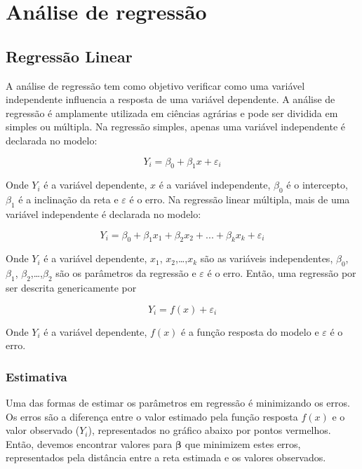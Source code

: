\documentclass[
]{book}
\begin{document}

\hypertarget{reg}{%
\chapter{Análise de regressão}\label{reg}}

\hypertarget{regressuxe3o-linear}{%
\section{Regressão Linear}\label{regressuxe3o-linear}}

A análise de regressão  tem como objetivo verificar como uma variável independente influencia a resposta de uma variável dependente. A análise de regressão é amplamente utilizada em ciências agrárias e pode ser dividida em simples ou múltipla. Na regressão simples, apenas uma variável independente é declarada no modelo:

\[
Y_i = {\beta _0} + {\beta _1}x + \varepsilon_i  
\]

Onde \(Y_i\) é a variável dependente, \(x\) é a variável independente, \(\beta_0\) é o intercepto, \(\beta_1\) é a inclinação da reta e \(\varepsilon\) é o erro. Na regressão linear múltipla, mais de uma variável independente é declarada no modelo:

\[
Y_i = {\beta _0} + {\beta _1}x_1 + {\beta _2}x_2 + ... + {\beta _k}x_k + \varepsilon_i  
\]

Onde \(Y_i\) é a variável dependente, \(x_1\), \(x_2\),\ldots,\(x_k\) são as variáveis independentes, \(\beta_0\), \(\beta_1\), \(\beta_2\),\ldots,\(\beta_2\) são os parâmetros da regressão e \(\varepsilon\) é o erro. Então, uma regressão por ser descrita genericamente por \citep{Draper1998}

\[
Y_i = f(x)+\varepsilon_i 
\]

Onde \(Y_i\) é a variável dependente, \(f(x)\) é a função resposta do modelo e \(\varepsilon\) é o erro.

\hypertarget{estimativa}{%
\subsection{Estimativa}\label{estimativa}}

Uma das formas de estimar os parâmetros em regressão é minimizando os erros. Os erros são a diferença entre o valor estimado pela função resposta \(f(x)\) e o valor observado (\(Y_i\)), representados no gráfico abaixo por pontos vermelhos. Então, devemos encontrar valores para \({\boldsymbol{\beta}}\) que minimizem estes erros, representados pela distância entre a reta estimada e os valores observados.
\end{document}
